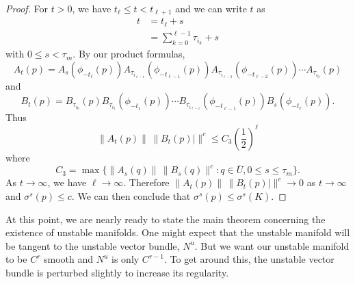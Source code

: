 \begin{proof}
	For \(t> 0\), we have \(t_\ell\leq t < t_{\ell+1}\) and we can write \(t\) as
	\begin{equation*}
		\begin{aligned}
			t &= t_\ell + s \\
			&= \sum_{k=0}^{\ell - 1} \tau_{i_k} +s 
		\end{aligned}
	\end{equation*}
	with \(0\leq s <\tau_m.\) By our product formulas,
	\begin{equation*}
		A_t(p) = A_s( \phi_{-t_\ell}(p) ) A_{\tau_{i_{\ell-1}}}(\phi_{-t_{\ell-1}}(p)) A_{\tau_{i_{\ell-2}}}(\phi_{-t_{\ell-2}}(p)) \cdots A_{\tau_{i_0}}(p)
	\end{equation*}
	and 
	\begin{equation*}
		B_t(p) = B_{\tau_{i_0}}(p) B_{\tau_{i_1}}(\phi_{-t_1}(p)) \cdots B_{\tau_{i_{\ell-1}}}(\phi_{-t_{\ell-1}}(p)) B_s(\phi_{-t_\ell}(p)).
	\end{equation*}
	Thus
	\begin{equation*}
		\| A_t(p) \| \, \| B_t(p)| \|^c \leq C_3 \left( \frac 1 2 \right)^\ell
	\end{equation*}
	where 
	\begin{equation*}
		C_3 = \max\{ \| A_s(q) \| \, \| B_s(q) \|^c : q\in \overline U, 0 \leq s \leq \tau_m\}.
	\end{equation*}
	As \(t\to\infty\), we have \(\ell \to \infty\). Therefore \( \| A_t(p) \| \, \| B_t(p)| \|^c\to 0\) as \(t\to\infty\) and \(\sigma^s(p) \leq c\). We can then conclude that \(\sigma^s(p) \leq \sigma^s(K).\)
\end{proof}

At this point, we are nearly ready to state the main theorem concerning the existence of unstable manifolds. One might expect that the unstable manifold will be tangent to the unstable vector bundle, \(N^u\). But we want our unstable manifold to be \(C^r\) smooth and \(N^u\) is only \(C^{r-1}\). To get around this, the unstable vector bundle is perturbed slightly to increase its regularity. 

